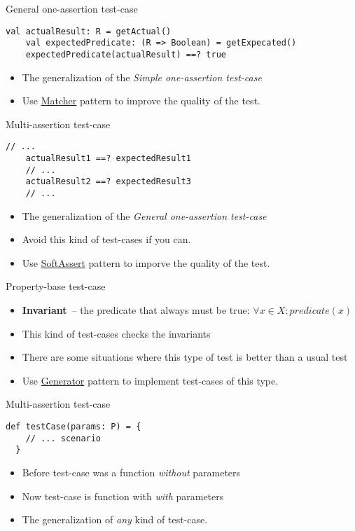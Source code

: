 \documentclass[aspectratio=169]{beamer}
\begin{document}
\begin{frame}[fragile]{General one-assertion test-case}
  \begin{lstlisting}[style=scala]
    val actualResult: R = getActual()
    val expectedPredicate: (R => Boolean) = getExpecated()
    expectedPredicate(actualResult) ==? true 
  \end{lstlisting}
  \begin{itemize}
    \item The generalization of the \textit{Simple one-assertion test-case}
    \item Use \underline{Matcher} pattern to improve the quality of the test.
  \end{itemize}
\end{frame}

\begin{frame}[fragile]{Multi-assertion test-case}
  \begin{lstlisting}[style=scala]
    // ...
    actualResult1 ==? expectedResult1
    // ...
    actualResult2 ==? expectedResult3
    // ...
  \end{lstlisting}
  \begin{itemize}
    \item The generalization of the \textit{General one-assertion test-case}
    \item Avoid this kind of test-cases if you can.
    \item Use \underline{SoftAssert} pattern to imporve the quality of the test.
  \end{itemize}
\end{frame}

\begin{frame}[fragile]{Property-base test-case}
  \begin{itemize}
    \item \textbf{Invariant}~-- the predicate that always must be true: $\forall x \in X: predicate(x)$
    \item This kind of test-cases checks the invariants
    \item There are some situations where this type of test is better than a usual test
    \item Use \underline{Generator} pattern to implement test-cases of this type.
  \end{itemize}
\end{frame}

\begin{frame}[fragile]{Multi-assertion test-case}
  \begin{lstlisting}[style=scala]
  def testCase(params: P) = {
    // ... scenario
  }
  \end{lstlisting}
  \begin{itemize}
    \item Before test-case was a function \textit{without} parameters
    \item Now test-case is function with \textit{with} parameters
    \item The generalization of \textit{any} kind of test-case.
  \end{itemize}
\end{frame}
\end{document}
